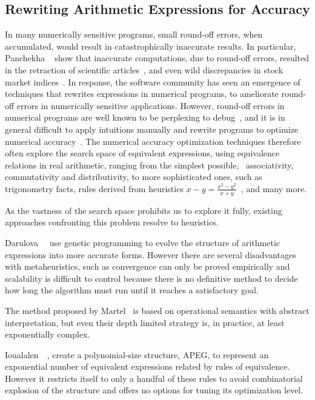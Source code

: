 
\subsection{Rewriting Arithmetic Expressions for Accuracy}
\label{bg:sub:expression_accuracy}

In many numerically sensitive programs, small round-off errors, when
accumulated, would result in catastrophically inaccurate results.  In
particular, Panchekha \etal~\cite{panchekha15} show that inaccurate
computations, due to round-off errors, resulted in the retraction of scientific
articles~\cite{altman99}, and even wild discrepancies in stock market
indices~\cite{mccullough99}.  In response, the software community has seen an
emergence of techniques that rewrites expressions in numerical programs, to
ameliorate round-off errors in numerically sensitive applications.  However,
round-off errors in numerical programs are well known to be perplexing to
debug~\cite{toronto14}, and it is in general difficult to apply intuitions
manually and rewrite programs to optimize numerical accuracy~\cite{toronto14}.
The numerical accuracy optimization techniques therefore often explore the
search space of equivalent expressions, using equivalence relations in
real arithmetic, ranging from the simplest possible, \eg~associativity,
commutativity and distributivity, to more sophisticated ones, such as
trigonometry facts, rules derived from heuristics $x - y = \frac{x^2 - y^2}{x
+ y}$~\cite{panchekha15}, and many more.

As the vastness of the search space prohibits us to explore it fully,
existing approaches confronting this problem resolve to heuristics.

Darulova~\etal~\cite{darulova} use genetic programming to evolve the structure
of arithmetic expressions into more accurate forms.  However there are several
disadvantages with metaheuristics, such as convergence can only be proved
empirically and scalability is difficult to control because there is no
definitive method to decide how long the algorithm must run until it reaches a
satisfactory goal.

The method proposed by Martel~\cite{martel07} is based on operational semantics
with abstract interpretation, but even their depth limited strategy is, in
practice, at least exponentially complex.

Ioualalen~\etal~\cite{ioualalen}, create a polynomial-size structure, APEG, to
represent an exponential number of equivalent expressions related by rules of
equivalence.  However it restricts itself to only a handful of these rules to
avoid combinatorial explosion of the structure and offers no options for tuning
its optimization level.

